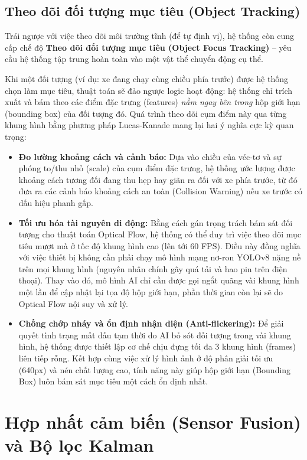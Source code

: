 \documentclass[../DoAn.tex]{subfiles}
\begin{document}
\subsection{Theo dõi đối tượng mục tiêu (Object Tracking)}
Trái ngược với việc theo dõi môi trường tĩnh (để tự định vị), hệ thống còn cung cấp chế độ \textbf{Theo dõi đối tượng mục tiêu (Object Focus Tracking)} – yêu cầu hệ thống tập trung hoàn toàn vào một vật thể chuyển động cụ thể.

Khi một đối tượng (ví dụ: xe đang chạy cùng chiều phía trước) được hệ thống chọn làm mục tiêu, thuật toán sẽ đảo ngược logic hoạt động: hệ thống chỉ trích xuất và bám theo các điểm đặc trưng (features) \textit{nằm ngay bên trong} hộp giới hạn (bounding box) của đối tượng đó. Quá trình theo dõi cụm điểm này qua từng khung hình bằng phương pháp Lucas-Kanade mang lại hai ý nghĩa cực kỳ quan trọng:
\begin{itemize}
    \item \textbf{Đo lường khoảng cách và cảnh báo:} Dựa vào chiều của véc-tơ và sự phóng to/thu nhỏ (scale) của cụm điểm đặc trưng, hệ thống ước lượng được khoảng cách tương đối đang thu hẹp hay giãn ra đối với xe phía trước, từ đó đưa ra các cảnh báo khoảng cách an toàn (Collision Warning) nếu xe trước có dấu hiệu phanh gấp.
    \item \textbf{Tối ưu hóa tài nguyên di động:} Bằng cách gán trọng trách bám sát đối tượng cho thuật toán Optical Flow, hệ thống có thể duy trì việc theo dõi mục tiêu mượt mà ở tốc độ khung hình cao (lên tới 60 FPS). Điều này đồng nghĩa với việc thiết bị không cần phải chạy mô hình mạng nơ-ron YOLOv8 nặng nề trên mọi khung hình (nguyên nhân chính gây quá tải và hao pin trên điện thoại). Thay vào đó, mô hình AI chỉ cần được gọi ngắt quãng vài khung hình một lần để cập nhật lại tọa độ hộp giới hạn, phần thời gian còn lại sẽ do Optical Flow nội suy và xử lý.
    \item \textbf{Chống chớp nháy và ổn định nhận diện (Anti-flickering):} Để giải quyết tình trạng mất dấu tạm thời do AI bỏ sót đối tượng trong vài khung hình, hệ thống được thiết lập cơ chế chịu đựng tối đa 3 khung hình (frames) liên tiếp rỗng. Kết hợp cùng việc xử lý hình ảnh ở độ phân giải tối ưu (640px) và nén chất lượng cao, tính năng này giúp hộp giới hạn (Bounding Box) luôn bám sát mục tiêu một cách ổn định nhất.
\end{itemize}

\section{Hợp nhất cảm biến (Sensor Fusion) và Bộ lọc Kalman}
\label{section:2.4}
\end{document}
